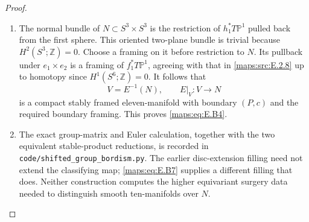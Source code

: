 \begin{proof}
\begin{enumerate}[label=\arabic*.,leftmargin=*]
\item The normal bundle of $N\subset S^3\times S^3$ is the
restriction of $h_1^*T\mathbb P^1$ pulled back from the first
sphere. This oriented two-plane bundle is trivial because
$H^2(S^3;\mathbb Z)=0$. Choose a framing on it before
restriction to $N$. Its pullback under $e_1\times e_2$
is a framing of $f_1^*T\mathbb P^1$, agreeing with that
in \ref{maps:src:E.2.8} up to homotopy since $H^1(S^6;\mathbb Z)=0$.
It follows that
\[
                  V=E^{-1}(N),\qquad E|_V:V\longrightarrow N
\]
is a compact stably framed eleven-manifold with boundary
$(P,c)$ and the required boundary framing. This proves \eqref{maps:eq:E.B4}.

\item The exact group-matrix and Euler calculation, together with
the two equivalent stable-product reductions, is recorded in
\texttt{code/shifted\_group\_bordism.py}.
The earlier disc-extension filling need not extend the
classifying map; \eqref{maps:eq:E.B7} supplies a different filling that does.
Neither construction computes the higher equivariant surgery
data needed to distinguish smooth ten-manifolds over $N$.
\end{enumerate}
\end{proof}


